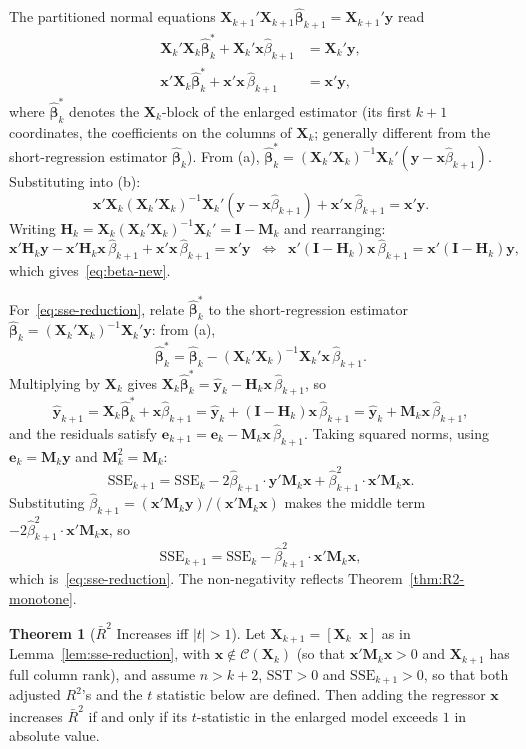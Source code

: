 \documentclass[12pt,a4paper]{article}
\makeatletter
\theoremstyle{definition}
\newtheorem{theorem}{Theorem}[section]
\renewenvironment{proof}[1][\proofname]{\par
  \pushQED{\qed}%
  \normalfont \topsep6\p@\@plus6\p@\relax
  \trivlist
  \item[\hskip\labelsep\bfseries #1\@addpunct{.}]\ignorespaces
}{%
  \popQED\endtrivlist\@endpefalse
}
\newcommand{\ifff}{\;\Longleftrightarrow\;}
\newcommand{\SST}{\mathrm{SST}}
\newcommand{\SSE}{\mathrm{SSE}}
\newcommand{\bX}{\mathbf{X}}
\newcommand{\by}{\mathbf{y}}
\newcommand{\bx}{\mathbf{x}}
\def\bb{\boldsymbol{\beta}}
\newcommand{\bI}{\mathbf{I}}
\newcommand{\bH}{\mathbf{H}}
\newcommand{\bM}{\mathbf{M}}
\newcommand{\calC}{\mathcal{C}}
\makeatother
\begin{document}
\begin{proof}
The partitioned normal equations $\bX_{k+1}'\bX_{k+1}\hat{\bb}_{k+1} = \bX_{k+1}'\by$ read
\begin{align*}
\bX_k'\bX_k\hat{\bb}_k^* + \bX_k'\bx\hat{\beta}_{k+1} &= \bX_k'\by, \tag{a}\\
\bx'\bX_k\hat{\bb}_k^* + \bx'\bx\,\hat{\beta}_{k+1} &= \bx'\by, \tag{b}
\end{align*}
where $\hat{\bb}_k^*$ denotes the $\bX_k$-block of the enlarged estimator (its first $k+1$ coordinates, the coefficients on the columns of $\bX_k$; generally different from the short-regression estimator $\hat{\bb}_k$). From (a), $\hat{\bb}_k^* = (\bX_k'\bX_k)^{-1}\bX_k'(\by - \bx\hat{\beta}_{k+1})$. Substituting into (b):
\[
\bx'\bX_k(\bX_k'\bX_k)^{-1}\bX_k'(\by - \bx\hat{\beta}_{k+1}) + \bx'\bx\,\hat{\beta}_{k+1} = \bx'\by.
\]
Writing $\bH_k = \bX_k(\bX_k'\bX_k)^{-1}\bX_k' = \bI - \bM_k$ and rearranging:
\[
\bx'\bH_k\by - \bx'\bH_k\bx\,\hat{\beta}_{k+1} + \bx'\bx\,\hat{\beta}_{k+1} = \bx'\by
\;\ifff\; \bx'(\bI - \bH_k)\bx\,\hat{\beta}_{k+1} = \bx'(\bI - \bH_k)\by,
\]
which gives~\eqref{eq:beta-new}.

For~\eqref{eq:sse-reduction}, relate $\hat{\bb}_k^*$ to the short-regression estimator $\hat{\bb}_k = (\bX_k'\bX_k)^{-1}\bX_k'\by$: from (a),
\[
\hat{\bb}_k^* = \hat{\bb}_k - (\bX_k'\bX_k)^{-1}\bX_k'\bx\,\hat{\beta}_{k+1}.
\]
Multiplying by $\bX_k$ gives $\bX_k\hat{\bb}_k^* = \hat{\by}_k - \bH_k\bx\,\hat{\beta}_{k+1}$, so
\[
\hat{\by}_{k+1} = \bX_k\hat{\bb}_k^* + \bx\hat{\beta}_{k+1} = \hat{\by}_k + (\bI - \bH_k)\bx\,\hat{\beta}_{k+1} = \hat{\by}_k + \bM_k\bx\,\hat{\beta}_{k+1},
\]
and the residuals satisfy $\mathbf{e}_{k+1} = \mathbf{e}_k - \bM_k\bx\,\hat{\beta}_{k+1}$. Taking squared norms, using $\mathbf{e}_k = \bM_k\by$ and $\bM_k^2 = \bM_k$:
\[
\SSE_{k+1} = \SSE_k - 2\hat{\beta}_{k+1}\cdot\by'\bM_k\bx + \hat{\beta}_{k+1}^2\cdot\bx'\bM_k\bx.
\]
Substituting $\hat{\beta}_{k+1} = (\bx'\bM_k\by)/(\bx'\bM_k\bx)$ makes the middle term $-2\hat{\beta}_{k+1}^2\cdot\bx'\bM_k\bx$, so
\[
\SSE_{k+1} = \SSE_k - \hat{\beta}_{k+1}^2\cdot\bx'\bM_k\bx,
\]
which is~\eqref{eq:sse-reduction}. The non-negativity reflects Theorem~\ref{thm:R2-monotone}.
\end{proof}

\begin{theorem}[$\bar{R}^2$ Increases iff $|t| > 1$]\label{thm:adj-R2}
Let $\bX_{k+1} = [\bX_k \;\; \bx]$ as in Lemma~\ref{lem:sse-reduction}, with $\bx \notin \calC(\bX_k)$ (so that $\bx'\bM_k\bx > 0$ and $\bX_{k+1}$ has full column rank), and assume $n > k + 2$, $\SST > 0$ and $\SSE_{k+1} > 0$, so that both adjusted $R^2$'s and the $t$ statistic below are defined. Then adding the regressor $\bx$ increases $\bar{R}^2$ if and only if its $t$-statistic in the enlarged model exceeds $1$ in absolute value.
\end{theorem}
\end{document}
